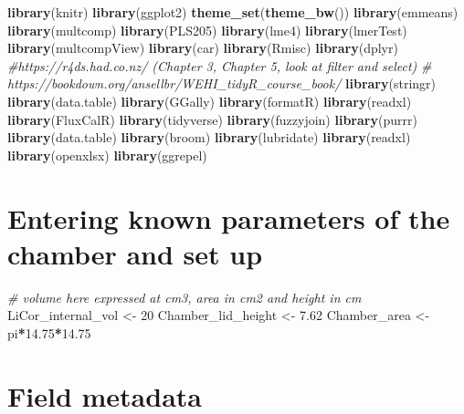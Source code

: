 \documentclass[
]{article}
\newenvironment{Shaded}{\begin{snugshade}}{\end{snugshade}}
\newcommand{\CommentTok}[1]{\textcolor[rgb]{0.56,0.35,0.01}{\textit{#1}}}
\newcommand{\DecValTok}[1]{\textcolor[rgb]{0.00,0.00,0.81}{#1}}
\newcommand{\FloatTok}[1]{\textcolor[rgb]{0.00,0.00,0.81}{#1}}
\newcommand{\FunctionTok}[1]{\textcolor[rgb]{0.13,0.29,0.53}{\textbf{#1}}}
\newcommand{\NormalTok}[1]{#1}
\newcommand{\OtherTok}[1]{\textcolor[rgb]{0.56,0.35,0.01}{#1}}
\newcommand{\SpecialCharTok}[1]{\textcolor[rgb]{0.81,0.36,0.00}{\textbf{#1}}}
\begin{document}
\begin{Shaded}
\begin{Highlighting}[]
\FunctionTok{library}\NormalTok{(knitr)}
\FunctionTok{library}\NormalTok{(ggplot2)}
\FunctionTok{theme\_set}\NormalTok{(}\FunctionTok{theme\_bw}\NormalTok{())}
\FunctionTok{library}\NormalTok{(emmeans)}
\FunctionTok{library}\NormalTok{(multcomp)}
\FunctionTok{library}\NormalTok{(PLS205)}
\FunctionTok{library}\NormalTok{(lme4)}
\FunctionTok{library}\NormalTok{(lmerTest)}
\FunctionTok{library}\NormalTok{(multcompView)}
\FunctionTok{library}\NormalTok{(car)}
\FunctionTok{library}\NormalTok{(Rmisc) }
\FunctionTok{library}\NormalTok{(dplyr) }\CommentTok{\#https://r4ds.had.co.nz/ (Chapter 3, Chapter 5, look at filter and select)}
\CommentTok{\# https://bookdown.org/ansellbr/WEHI\_tidyR\_course\_book/}
\FunctionTok{library}\NormalTok{(stringr) }
\FunctionTok{library}\NormalTok{(data.table)}
\FunctionTok{library}\NormalTok{(GGally)}
\FunctionTok{library}\NormalTok{(formatR)}
\FunctionTok{library}\NormalTok{(readxl)}
\FunctionTok{library}\NormalTok{(FluxCalR)}
\FunctionTok{library}\NormalTok{(tidyverse)}
\FunctionTok{library}\NormalTok{(fuzzyjoin)}
\FunctionTok{library}\NormalTok{(purrr)}
\FunctionTok{library}\NormalTok{(data.table)}
\FunctionTok{library}\NormalTok{(broom)}
\FunctionTok{library}\NormalTok{(lubridate)}
\FunctionTok{library}\NormalTok{(readxl)}
\FunctionTok{library}\NormalTok{(openxlsx)}
\FunctionTok{library}\NormalTok{(ggrepel)}
\end{Highlighting}
\end{Shaded}

\section{Entering known parameters of the chamber and set
up}\label{entering-known-parameters-of-the-chamber-and-set-up}

\begin{Shaded}
\begin{Highlighting}[]
\CommentTok{\# volume here expressed at cm3, area in cm2 and height in cm}
\NormalTok{LiCor\_internal\_vol }\OtherTok{\textless{}{-}} \DecValTok{20}
\NormalTok{Chamber\_lid\_height }\OtherTok{\textless{}{-}} \FloatTok{7.62}
\NormalTok{Chamber\_area }\OtherTok{\textless{}{-}}\NormalTok{ pi}\SpecialCharTok{*}\FloatTok{14.75}\SpecialCharTok{*}\FloatTok{14.75}
\end{Highlighting}
\end{Shaded}

\section{Field metadata}\label{field-metadata}
\end{document}
